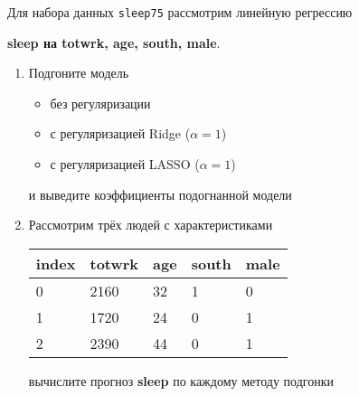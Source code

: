 \begin{exercise}
Для набора данных \texttt{sleep75} рассмотрим линейную регрессию 
\begin{center}
	\textbf{sleep на totwrk, age, south, male}.
\end{center}
\begin{enumerate}
	\item Подгоните модель
	\begin{itemize}
		\item без регуляризации
		\item с регуляризацией Ridge (\(\alpha=1\))
		\item с регуляризацией LASSO (\(\alpha=1\))
	\end{itemize}
	и выведите коэффициенты подогнанной модели
	\item Рассмотрим трёх людей с характеристиками
	\begin{center}
		\begin{tabular}{|l||l|l|l|l|}\hline
			index & totwrk & age & south & male \\ \hline\hline
			0 & 2160 & 32 & 1 & 0 \\
			1 & 1720 & 24 & 0 & 1 \\
			2 & 2390 & 44 & 0 & 1 \\ \hline
		\end{tabular}
	\end{center}
	вычислите прогноз \textbf{sleep} по каждому методу подгонки
\end{enumerate}
\end{exercise}

